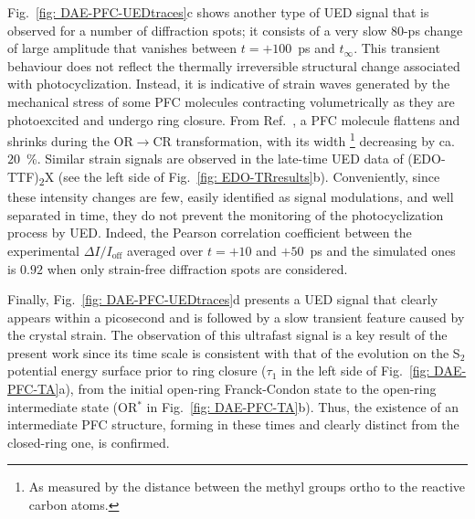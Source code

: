 Fig.~\ref{fig: DAE-PFC-UEDtraces}c shows another type of UED signal that is observed
for a number of diffraction spots; it consists of a very slow $80$-ps change of large amplitude
that vanishes between $t = +100$~ps and $t_\infty$.
This transient behaviour does not reflect the thermally irreversible structural change
associated with photocyclization.
Instead, it is indicative of strain waves generated by the mechanical stress of
some PFC molecules contracting volumetrically as they are photoexcited and undergo ring closure.
From Ref.~\cite{Irie2001}, a PFC molecule flattens and shrinks during the OR$\rightarrow$CR transformation,
with its width%
\footnote{As measured by the distance between the methyl groups ortho to the reactive carbon atoms.}
decreasing by ca.~$20$~\%.
Similar strain signals are observed in the late-time UED data of (EDO-TTF)\textsubscript{2}X
(see the left side of Fig.~\ref{fig: EDO-TRresults}b).
Conveniently, since these intensity changes are few, easily identified as signal modulations,
and well separated in time, they do not prevent the monitoring of the photocyclization process by UED.
Indeed, the Pearson correlation coefficient between
the experimental $\Delta I/I_\mathrm{off}$ averaged over $t = +10$ and $+50$~ps and
the simulated ones is $0.92$ when only strain-free diffraction spots are considered.

Finally, Fig.~\ref{fig: DAE-PFC-UEDtraces}d presents a UED signal
that clearly appears within a picosecond and is followed by a slow transient feature
caused by the crystal strain.
The observation of this ultrafast signal is a key result of the present work
since its time scale is consistent with that of the evolution on the S$_2$ potential energy surface
prior to ring closure ($\tau_1$ in the left side of Fig.~\ref{fig: DAE-PFC-TA}a),
from the initial open-ring Franck-Condon state to the open-ring intermediate state
(OR$^*$ in Fig.~\ref{fig: DAE-PFC-TA}b).
Thus, the existence of an intermediate PFC structure, forming in these times and
clearly distinct from the closed-ring one, is confirmed.

